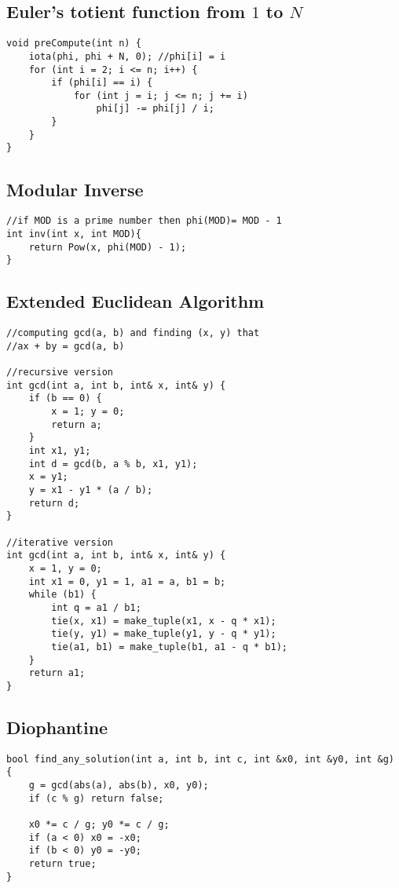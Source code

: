 \documentclass[11pt,a4paper]{article}
\begin{document}
\begin{multicols*}{2}
\subsection{Euler's totient function from $1$ to $N$}
\begin{lstlisting}
void preCompute(int n) {
    iota(phi, phi + N, 0); //phi[i] = i
    for (int i = 2; i <= n; i++) {
        if (phi[i] == i) {
            for (int j = i; j <= n; j += i)
                phi[j] -= phi[j] / i;
        }
    }
}
\end{lstlisting}

\subsection{Modular Inverse}
\begin{lstlisting}
//if MOD is a prime number then phi(MOD)= MOD - 1
int inv(int x, int MOD){
    return Pow(x, phi(MOD) - 1);
}
\end{lstlisting}

\subsection{Extended Euclidean Algorithm}
\begin{lstlisting}
//computing gcd(a, b) and finding (x, y) that
//ax + by = gcd(a, b)

//recursive version
int gcd(int a, int b, int& x, int& y) {
    if (b == 0) {
        x = 1; y = 0;
        return a;
    }
    int x1, y1;
    int d = gcd(b, a % b, x1, y1);
    x = y1;
    y = x1 - y1 * (a / b);
    return d;
}

//iterative version
int gcd(int a, int b, int& x, int& y) {
    x = 1, y = 0;
    int x1 = 0, y1 = 1, a1 = a, b1 = b;
    while (b1) {
        int q = a1 / b1;
        tie(x, x1) = make_tuple(x1, x - q * x1);
        tie(y, y1) = make_tuple(y1, y - q * y1);
        tie(a1, b1) = make_tuple(b1, a1 - q * b1);
    }
    return a1;
}
\end{lstlisting}

\subsection{Diophantine}
\begin{lstlisting}
bool find_any_solution(int a, int b, int c, int &x0, int &y0, int &g) {
    g = gcd(abs(a), abs(b), x0, y0);
    if (c % g) return false;

    x0 *= c / g; y0 *= c / g;
    if (a < 0) x0 = -x0;
    if (b < 0) y0 = -y0;
    return true;
}


\end{lstlisting}
\end{multicols*}
\end{document}
